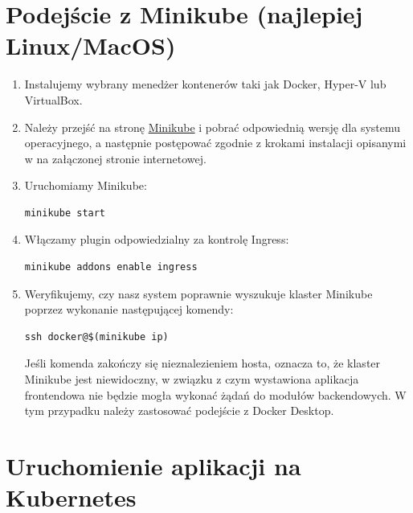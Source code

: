 \documentclass[polish]{aghengthesis}
\begin{document}
\section{Podejście z Minikube (najlepiej Linux/MacOS)}

\begin{enumerate}
\item Instalujemy wybrany menedżer kontenerów taki jak Docker, Hyper-V lub VirtualBox.
\item Należy przejść na stronę \href{https://minikube.sigs.k8s.io/docs/start/}{Minikube} i pobrać odpowiednią wersję dla systemu operacyjnego, a następnie postępować zgodnie z krokami instalacji opisanymi w na załączonej stronie internetowej.
\item Uruchomiamy Minikube:
\begin{lstlisting}[basicstyle=\ttfamily, numbers=none]
minikube start\end{lstlisting}\vspace{-20pt}
\item Włączamy plugin odpowiedzialny za kontrolę Ingress:
\begin{lstlisting}[basicstyle=\ttfamily, numbers=none]
minikube addons enable ingress
\end{lstlisting}\vspace{-20pt}
\item Weryfikujemy, czy nasz system poprawnie wyszukuje klaster Minikube poprzez wykonanie następującej komendy:
\begin{lstlisting}[basicstyle=\ttfamily, numbers=none]
ssh docker@$(minikube ip)
\end{lstlisting}\vspace{-20pt}
Jeśli komenda zakończy się nieznalezieniem hosta, oznacza to, że klaster Minikube jest niewidoczny, w związku z czym wystawiona aplikacja frontendowa nie będzie mogła wykonać żądań do modułów backendowych. W tym przypadku należy zastosować podejście z Docker Desktop.
\end{enumerate}


\section{Uruchomienie aplikacji na Kubernetes}
\end{document}
